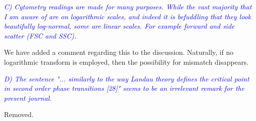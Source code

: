 \documentclass[letter,11pt,draft]{article}
\newcommand{\re}[1]{\emph{\textcolor{blue}{#1}}}
\begin{document}
\re{C) Cytometry readings are made for many purposes. While the vast majority that I am aware of are on logarithmic scales, and indeed it is befuddling that they look beautifully log-normal, some are linear scales. For example forward and side scatter (FSC and SSC).}

\smallskip
We have added a comment regarding this to the discussion. Naturally, if no logarithmic transform is employed, then the possibility for mismatch disappears.


\re{
D) The sentence
"... similarly to the way Landau theory defines the critical point in second order phase transitions [28]"
seems to be an irrelevant remark for the present journal.}

\smallskip
Removed.


\end{document}
